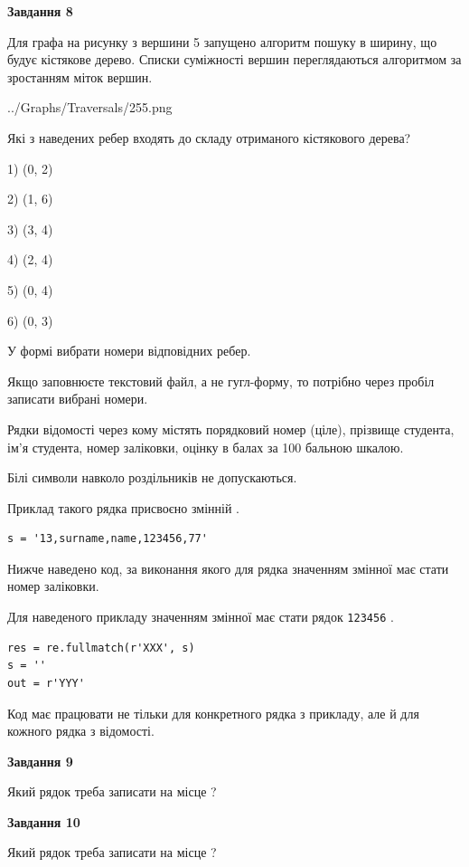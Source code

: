 \documentclass[12pt, ukrainian]{article}
\def\code#1{\Verb!#1!}
\begin{document}
{\begin {large}
{\begin {center}\textbf{Завдання 8}\end {center}}\par
Для графа на рисунку з вершини 5 запущено алгоритм пошуку в ширину, що будує кістякове дерево. Списки суміжності вершин переглядаються алгоритмом за зростанням міток вершин.\par
\begin{center}
	{../Graphs/Traversals/255.png}
\end{center}
\par Які з наведених ребер входять до складу отриманого кістякового дерева?\par
1) (0, 2)\par
2) (1, 6)\par
3) (3, 4)\par
4) (2, 4)\par
5) (0, 4)\par
6) (0, 3)\par
{\vskip 15pt} У формі вибрати номери відповідних ребер.


Якщо заповнюєте текстовий файл, а не гугл-форму, то потрібно через пробіл записа\-ти вибрані номери.\par
\newpage


Рядки відомості через кому містять порядковий номер (ціле), пріз\-ви\-ще студен\-та, ім'я студента, номер заліковки, оцінку в балах за 100 бальною шкалою.

Білі символи навколо роздільників не допускаються.

Приклад такого рядка присвоєно змінній .



\begin{verbatim}
s = '13,surname,name,123456,77'
\end{verbatim}


Нижче наведено код, за виконання якого для рядка  значенням змінної  має стати номер заліковки.

Для наведеного прикладу значенням змінної  має стати рядок \code{123456} .



\begin{verbatim}
res = re.fullmatch(r'XXX', s)
s = ''
out = r'YYY'
\end{verbatim}


Код має працювати не тільки для конкретного рядка з прикладу, але й для кожного рядка з відомості.

{\begin {center}\textbf{Завдання 9}\end {center}}\par
Який рядок треба записати на місце  ?\par
\vspace{5mm}


{\begin {center}\textbf{Завдання 10}\end {center}}\par
Який рядок треба записати на місце  ?\par


\newpage


\end {large}}
\end{document}
